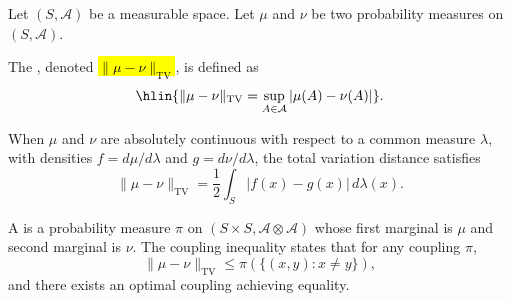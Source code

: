 \begin{definition} \label{definition:total_variation_distance_between_two_probability_measures}
Let $(S, \mathcal{A})$ be a measurable space. Let $\mu$ and $\nu$ be two probability measures on $(S, \mathcal{A})$.

The , denoted \hl{$\|\mu - \nu\|_{\mathrm{TV}}$}, is defined as
$$\hlin{\|\mu - \nu\|_{\mathrm{TV}} = \sup_{A \in \mathcal{A}} |\mu(A) - \nu(A)|}.$$

When $\mu$ and $\nu$ are absolutely continuous with respect to a common measure $\lambda$, with densities $f = d\mu/d\lambda$ and $g = d\nu/d\lambda$, the total variation distance satisfies
$$\|\mu - \nu\|_{\mathrm{TV}} = \frac{1}{2} \int_S |f(x) - g(x)| \, d\lambda(x).$$

A  is a probability measure $\pi$ on $(S \times S, \mathcal{A} \otimes \mathcal{A})$ whose first marginal is $\mu$ and second marginal is $\nu$. The coupling inequality states that for any coupling $\pi$,
$$\|\mu - \nu\|_{\mathrm{TV}} \leq \pi(\{(x, y) : x \neq y\}),$$
and there exists an optimal coupling achieving equality.
\end{definition}
